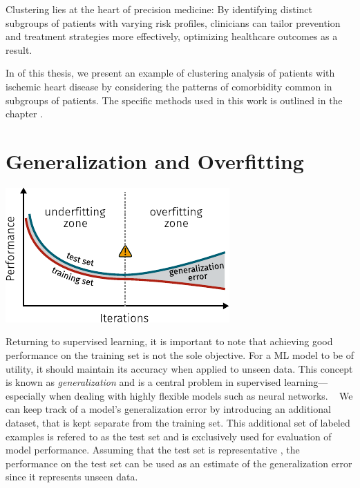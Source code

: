 Clustering lies at the heart of precision medicine:
By identifying distinct subgroups of patients with varying risk profiles, 
clinicians can tailor prevention and treatment strategies more effectively, 
optimizing healthcare outcomes as a result.

In  of this thesis,
we present an example of clustering analysis of patients with 
ischemic heart disease by considering the patterns of comorbidity 
common in subgroups of patients.
The specific methods used in this work is outlined 
in the chapter .

\section{Generalization and Overfitting}
\label{overfitting}

\begin{marginfigure}[3em]
    \centering
	\includegraphics{graphics/overfitting-2}
    \caption[Overfitting as Function of Number of Epochs]{%
        Training a neural network model for many iterations 
        runs the risk of overfitting the model to the training data.
        Although the training error keeps decreasing, 
        it happens at the expense of increased generalization error.
        Inspired by \cite{goodfellow2016deep}.
    }
    \label{fig:generalization-error}
\end{marginfigure}

Returning to supervised learning,
it is important to note that achieving good performance on the 
training set is not the sole objective.
For a \ac{ML} model to be of utility, 
it should maintain its accuracy
when applied to unseen data.
This concept is known as \textit{generalization} and
is a central problem in supervised learning---%
especially when dealing with highly flexible models 
such as neural networks.
~\autocite{goodfellow2016deep}
We can keep track of a model's generalization error 
by introducing an additional dataset, 
that is kept separate from the training set. 
This additional set of labeled examples is refered to as the test set
and is exclusively used for evaluation of model performance.
Assuming that the test set is representative%
\sidenote{%
    An underlying assumption is that the two datasets are 
    independent and identically distributed 
    (typically abbreviated as i.i.d.),
    and thus share the same underlying \textit{data-generating process}.
    [\cite{goodfellow2016deep}]
},
the performance on the test set can be used as an estimate of 
the generalization error since it represents unseen data.


